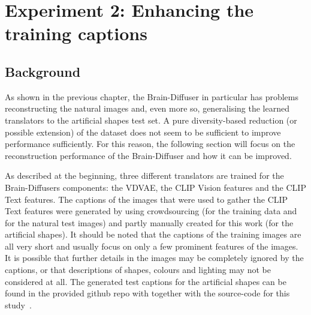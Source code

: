 \section{Experiment 2: Enhancing the training captions}

\subsection{Background}

As shown in the previous chapter, the Brain-Diffuser in particular has problems reconstructing the natural images and, even more so, generalising the learned translators to the artificial shapes test set. A pure diversity-based reduction (or possible extension) of the dataset does not seem to be sufficient to improve performance sufficiently. For this reason, the following section will focus on the reconstruction performance of the Brain-Diffuser and how it can be improved. 

As described at the beginning, three different translators are trained for the Brain-Diffusers components: the VDVAE, the CLIP Vision features and the CLIP Text features. The captions of the images that were used to gather the CLIP Text features were generated by using crowdsourcing (for the training data and for the natural test images) and partly manually created for this work (for the artificial shapes). It should be noted that the captions of the training images are all very short and usually focus on only a few prominent features of the images. It is possible that further details in the images may be completely ignored by the captions, or that descriptions of shapes, colours and lighting may not be considered at all. The generated test captions for the artificial shapes can be found in the provided github repo with together with the source-code for this study~\cite{mildenbergerKamitaniLabBrain_diffuser}.

